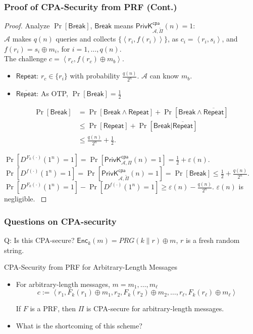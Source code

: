 \begin{frame}\frametitle{Proof of CPA-Security from PRF (Cont.)}
\begin{proof}
Analyze $\Pr[\mathsf{Break}]$, $\mathsf{Break}$ means $\mathsf{PrivK}_{\mathcal{A},\tilde{\Pi}}^{\mathsf{cpa}}(n) = 1$:  \\
$\mathcal{A}$ makes $q(n)$ queries and collects $\{ \left< r_i, f(r_i) \right> \}$, as $c_i = \left< r_i, s_i \right>$, and $f(r_i) = s_i \oplus m_i$, for $i=1,\dots,q(n)$.\\
The challenge $c=\left<r_c, f(r_c)\oplus m_b\right>$. \\
\begin{itemize}
\item $\mathsf{Repeat}$: $r_c \in \{ r_i \}$ with probability $\frac{q(n)}{2^n}$. $\mathcal{A}$ can know $m_b$.
\item $\overline{\mathsf{Repeat}}$: As OTP, $\Pr[\mathsf{Break}]=\frac{1}{2}$ 
\end{itemize}
\[
\begin{split}
	\Pr[\mathsf{Break}] & =\Pr[\mathsf{Break} \land \mathsf{Repeat}] + \Pr[\mathsf{Break} \land \overline{\mathsf{Repeat}}] \\
	&\le \Pr[\mathsf{Repeat}] + \Pr[\mathsf{Break} | \overline{\mathsf{Repeat}}] \\
	&\le \frac{q(n)}{2^n} + \frac{1}{2}.
\end{split}
\]

{\footnotesize 
$ \Pr[D^{F_k(\cdot)}(1^n)=1] = \Pr[\mathsf{PrivK}_{\mathcal{A},\Pi}^{\mathsf{cpa}}(n) = 1] = \frac{1}{2} + \varepsilon(n). $
$ \Pr[D^{f(\cdot)}(1^n)=1] = \Pr[\mathsf{PrivK}_{\mathcal{A},\tilde{\Pi}}^{\mathsf{cpa}}(n) = 1] = \Pr[\mathsf{Break}] \le \frac{1}{2} + \frac{q(n)}{2^n}. $
$\Pr[D^{F_k(\cdot)}(1^n)=1] - \Pr[D^{f(\cdot)}(1^n)=1] \ge \varepsilon(n) - \frac{q(n)}{2^n}.$
$\varepsilon(n)$ is negligible.
}
\end{proof}
\end{frame}
\begin{frame}\frametitle{Questions on CPA-security}
\begin{exampleblock}{Q: Is this CPA-secure?}
$\mathsf{Enc}_k(m) = PRG(k\|r) \oplus m $, $r$ is a fresh random string.
\end{exampleblock}
\begin{exampleblock}{CPA-Security from PRF for Arbitrary-Length Messages}
\begin{itemize}
\item For arbitrary-length messages, $m = m_1, \dots , m_{\ell}$
\[ c := \left< r_1, F_k(r_1) \oplus m_1, r_2, F_k(r_2) \oplus m_2, \dots, r_\ell, F_k(r_\ell) \oplus m_\ell\right>
\]
\begin{corollary}
If $F$ is a PRF, then $\Pi$ is CPA-secure for arbitrary-length messages.
\end{corollary}
\item What is the shortcoming of this scheme? 
\end{itemize}
\end{exampleblock}
\end{frame}
